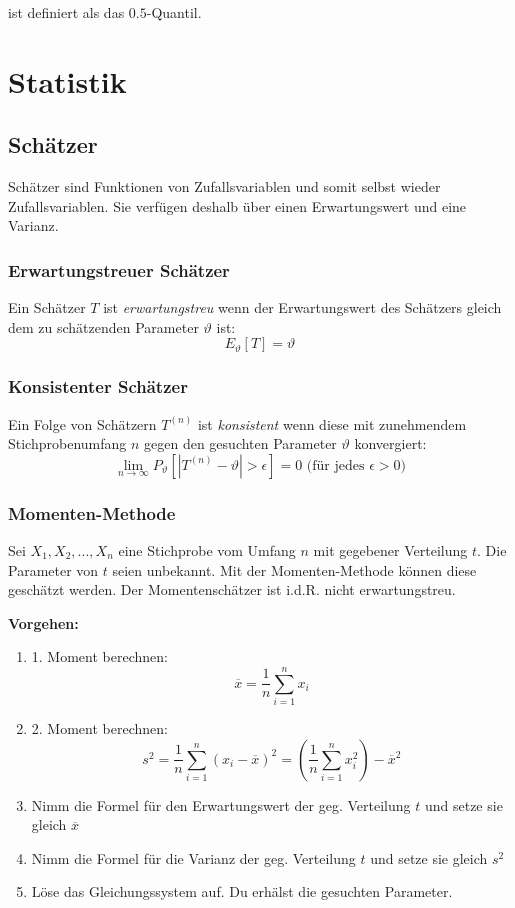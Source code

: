\begin{definition}
	ist definiert als das \(0.5\)-Quantil.
\end{definition}



\section{Statistik}

\subsection{Schätzer}
Schätzer sind Funktionen von Zufallsvariablen und somit selbst wieder Zufallsvariablen. Sie verfügen deshalb über einen Erwartungswert und eine Varianz.

\subsubsection{Erwartungstreuer Schätzer}
Ein Schätzer $T$ ist \emph{erwartungstreu} wenn der Erwartungswert des Schätzers gleich dem zu schätzenden Parameter $\vartheta$ ist:
\[
E_\vartheta [T] = \vartheta
\]

\subsubsection{Konsistenter Schätzer}
Ein Folge von Schätzern $T^{(n)}$ ist \emph{konsistent} wenn diese mit zunehmendem Stichprobenumfang $n$ gegen den gesuchten Parameter $\vartheta$ konvergiert:
\[
\lim_{n\to\infty}P_{\vartheta}\left[|T^{(n)}-\vartheta| > \epsilon\right] = 0\text{ (für jedes $\epsilon > 0$)}
\]

\subsubsection{Momenten-Methode}
Sei $X_1,X_2,...,X_n$ eine Stichprobe vom Umfang $n$ mit gegebener Verteilung $t$. Die Parameter von $t$ seien unbekannt. Mit der Momenten-Methode können diese geschätzt werden. Der Momentenschätzer ist i.d.R. nicht erwartungstreu.

\vspace{10pt}

\textbf{Vorgehen:}
\begin{enumerate}
	\item 1. Moment berechnen:
	\[
	\overline{x} = \frac{1}{n}\sum\limits_{i=1}^{n}x_i
	\]
	\item 2. Moment berechnen:
	\[
	s^2 = \frac{1}{n}\sum\limits_{i=1}^{n}\left(x_i - \overline{x}\right)^2=\left( \frac{1}{n}\sum\limits_{i=1}^{n}x_i^2\right)-\overline{x}^2
	\]
	\item Nimm die Formel für den Erwartungswert der geg. Verteilung $t$ und setze sie gleich $\overline{x}$
	\item Nimm die Formel für die Varianz der geg. Verteilung $t$ und setze sie gleich $s^2$
	\item Löse das Gleichungssystem auf. Du erhälst die gesuchten Parameter.
\end{enumerate}

